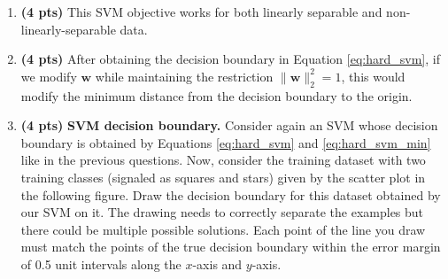 \documentclass{article}
\begin{document}
\begin{enumerate}[1.]

\item {\bf (4 pts)} This SVM objective works for both linearly separable and non-linearly-separable data. 
        
        
\begin{tcolorbox}[breakable,
enhanced,
notitle,
width=16.6cm,
height=4cm]
 {

 }

\end{tcolorbox}

        
\item {\bf (4 pts)} After obtaining the decision boundary in Equation \ref{eq:hard_svm}, if we modify $\textbf{w}$ while maintaining the restriction $\|\textbf{w}\|^2_{2}=1$, this would modify the minimum distance from the decision boundary to the origin. 

\begin{tcolorbox}[breakable,
enhanced,
notitle,
width=16.6cm,
height=3cm]
 {

 }

\end{tcolorbox}


        
\newpage        
\item {\bf (4 pts)} {\bf  SVM decision boundary.}
Consider again an SVM whose decision boundary is obtained by Equations \ref{eq:hard_svm} and 
 \ref{eq:hard_svm_min} like in the previous questions. Now, consider the training dataset with two training classes (signaled as squares and stars) given by the scatter plot in the following figure. Draw the decision boundary for this dataset obtained by our SVM on it. The drawing needs to correctly separate the examples but there could be multiple possible solutions. Each point of the line you draw must match the points of the true decision boundary within the error margin of 0.5 unit intervals along the $x$-axis and $y$-axis. 

\begin{center}
\end{center}
\end{enumerate}
\end{document}
